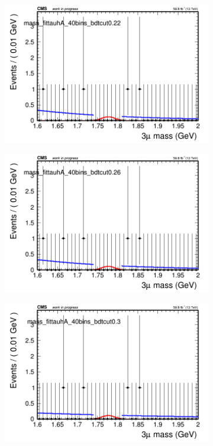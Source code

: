 \begin{figure}[H]
\begin{subfigure}{0.2\textwidth}
        \includegraphics[width=\textwidth]{unfixed_exp/plots/tauhA/massfit_tauhA_40bins_bdtcut0.22.png}
        \caption{}
    \end{subfigure}
    \begin{subfigure}{0.2\textwidth}
        \includegraphics[width=\textwidth]{unfixed_exp/plots/tauhA/massfit_tauhA_40bins_bdtcut0.26.png}
        \caption{}
    \end{subfigure}
    \begin{subfigure}{0.2\textwidth}
        \includegraphics[width=\textwidth]{unfixed_exp/plots/tauhA/massfit_tauhA_40bins_bdtcut0.3.png}

\end{subfigure}
\end{figure}
